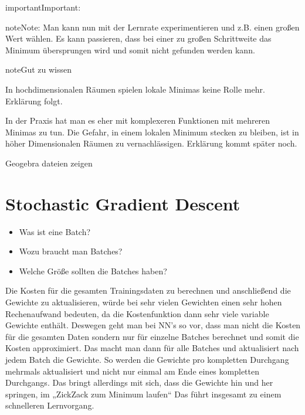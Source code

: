 \documentclass[letterpaper,10pt,english]{jupyterBook}
\begin{document}
\begin{sphinxadmonition}{important}{Important:}
\begin{sphinxadmonition}{note}{Note:}
\sphinxAtStartPar
Man kann nun mit der Lernrate experimentieren und z.B. einen großen Wert wählen. Es kann passieren, dass bei einer zu großen Schrittweite das Minimum übersprungen wird und somit nicht gefunden werden kann.
\end{sphinxadmonition}
\end{sphinxadmonition}

\begin{sphinxadmonition}{note}{Gut zu wissen}

\sphinxAtStartPar
In hochdimensionalen Räumen spielen lokale Minimas keine Rolle mehr. Erklärung folgt.
\end{sphinxadmonition}

\sphinxAtStartPar
In der Praxis hat man es eher mit komplexeren Funktionen mit mehreren Minimas zu tun. Die Gefahr, in einem lokalen Minimum stecken zu bleiben, ist in höher Dimensionalen Räumen zu vernachlässigen. Erklärung kommt später noch.

\sphinxAtStartPar
Geogebra dateien zeigen


\section{Stochastic Gradient Descent}
\label{\detokenize{02_NN/NN_learning:stochastic-gradient-descent}}
\sphinxAtStartPar
{}
\begin{itemize}
\item {} 
\sphinxAtStartPar
Was ist eine Batch?

\item {} 
\sphinxAtStartPar
Wozu braucht man Batches?

\item {} 
\sphinxAtStartPar
Welche Größe sollten die Batches haben?

\end{itemize}

\sphinxAtStartPar
Die Kosten für die gesamten Trainingsdaten zu berechnen und anschließend die Gewichte zu aktualisieren, würde bei sehr vielen Gewichten einen sehr hohen Rechenaufwand bedeuten, da die Kostenfunktion dann sehr viele variable Gewichte enthält. Deswegen geht man bei NN’s so vor, dass man nicht die Kosten für die gesamten Daten sondern nur für einzelne Batches berechnet und somit die Kosten approximiert. Das macht man dann für alle Batches und aktualisiert nach jedem Batch die Gewichte. So werden die Gewichte pro kompletten Durchgang mehrmals aktualisiert und nicht nur einmal am Ende eines kompletten Durchgangs. Das bringt allerdings mit sich, dass die Gewichte hin und her springen, im „ZickZack zum Minimum laufen“ Das führt insgesamt zu einem schnelleren Lernvorgang.
\end{document}
